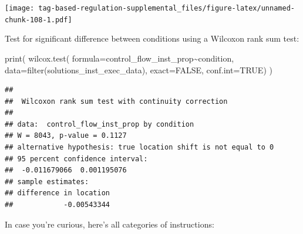 \documentclass[
]{book}
\newenvironment{Shaded}{\begin{snugshade}}{\end{snugshade}}
\newcommand{\AttributeTok}[1]{\textcolor[rgb]{0.77,0.63,0.00}{#1}}
\newcommand{\ConstantTok}[1]{\textcolor[rgb]{0.00,0.00,0.00}{#1}}
\newcommand{\FunctionTok}[1]{\textcolor[rgb]{0.00,0.00,0.00}{#1}}
\newcommand{\NormalTok}[1]{#1}
\newcommand{\SpecialCharTok}[1]{\textcolor[rgb]{0.00,0.00,0.00}{#1}}
\begin{document}
\texttt{[image: tag-based-regulation-supplemental\_files/figure-latex/unnamed-chunk-108-1.pdf]}

Test for significant difference between conditions using a Wilcoxon rank sum test:

\begin{Shaded}
\begin{Highlighting}[]
\FunctionTok{print}\NormalTok{(}
  \FunctionTok{wilcox.test}\NormalTok{(}
    \AttributeTok{formula=}\NormalTok{control\_flow\_inst\_prop}\SpecialCharTok{\textasciitilde{}}\NormalTok{condition,}
    \AttributeTok{data=}\FunctionTok{filter}\NormalTok{(solutions\_inst\_exec\_data),}
    \AttributeTok{exact=}\ConstantTok{FALSE}\NormalTok{,}
    \AttributeTok{conf.int=}\ConstantTok{TRUE}\NormalTok{)}
\NormalTok{)}
\end{Highlighting}
\end{Shaded}

\begin{verbatim}
## 
##  Wilcoxon rank sum test with continuity correction
## 
## data:  control_flow_inst_prop by condition
## W = 8043, p-value = 0.1127
## alternative hypothesis: true location shift is not equal to 0
## 95 percent confidence interval:
##  -0.011679066  0.001195076
## sample estimates:
## difference in location 
##            -0.00543344
\end{verbatim}

In case you're curious, here's all categories of instructions:
\end{document}
